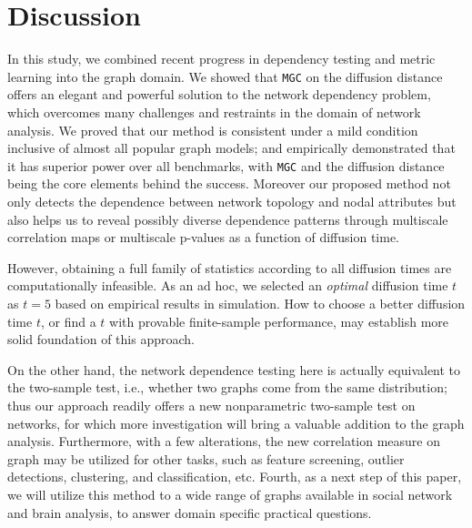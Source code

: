 \documentclass[11pt]{article}
\theoremstyle{definition}
\begin{document}
\section{Discussion}
\label{sec:conc}

In this study, we combined recent progress in dependency testing and metric learning into the graph domain. We showed that \texttt{MGC} on the diffusion distance offers an elegant and powerful solution to the network dependency problem, which overcomes many challenges and restraints in the domain of network analysis. We proved that our method is consistent under a mild condition inclusive of almost all popular graph models; and empirically demonstrated that it has superior power over all benchmarks, with \texttt{MGC} and the diffusion distance being the core elements behind the success. Moreover our proposed method not only detects the dependence between network topology and nodal attributes but also helps us to reveal possibly diverse dependence patterns through multiscale correlation maps or multiscale p-values as a function of diffusion time. 

However, obtaining a full family of statistics according to all diffusion times are computationally infeasible. As an ad hoc, we selected an \textit{optimal} diffusion time $t$ as $t=5$ based on empirical results in simulation. How to choose a better diffusion time $t$, or find a $t$ with provable finite-sample performance, may establish more solid foundation of this approach. 

On the other hand, the network dependence testing here is actually equivalent to the two-sample test, i.e., whether two graphs come from the same distribution; thus our approach readily offers a new nonparametric two-sample test on networks, for which more investigation will bring a valuable addition to the graph analysis. Furthermore, with a few alterations, the new correlation measure on graph may be utilized for other tasks, such as feature screening, outlier detections, clustering, and classification, etc. Fourth, as a next step of this paper, we will utilize this method to a wide range of graphs available in social network and brain analysis, to answer domain specific practical questions.

\end{document}
